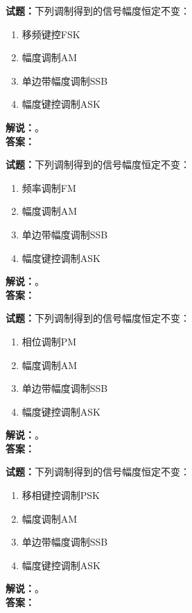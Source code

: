 \documentclass{ctexbook}
\begin{document}
\bigskip




\noindent\textbf{试题：}下列调制得到的信号幅度恒定不变：
\begin{enumerate}[leftmargin=3em]
\item 移频键控FSK
\item 幅度调制AM
\item 单边带幅度调制SSB
\item 幅度键控调制ASK
\end{enumerate}
\noindent\textbf{解说：}\textbf{}。\\\noindent\textbf{答案：}

\bigskip




\noindent\textbf{试题：}下列调制得到的信号幅度恒定不变：
\begin{enumerate}[leftmargin=3em]
\item 频率调制FM
\item 幅度调制AM
\item 单边带幅度调制SSB
\item 幅度键控调制ASK
\end{enumerate}
\noindent\textbf{解说：}\textbf{}。\\\noindent\textbf{答案：}

\bigskip




\noindent\textbf{试题：}下列调制得到的信号幅度恒定不变：
\begin{enumerate}[leftmargin=3em]
\item 相位调制PM
\item 幅度调制AM
\item 单边带幅度调制SSB
\item 幅度键控调制ASK
\end{enumerate}
\noindent\textbf{解说：}\textbf{}。\\\noindent\textbf{答案：}

\bigskip




\noindent\textbf{试题：}下列调制得到的信号幅度恒定不变：
\begin{enumerate}[leftmargin=3em]
\item 移相键控调制PSK
\item 幅度调制AM
\item 单边带幅度调制SSB
\item 幅度键控调制ASK
\end{enumerate}
\noindent\textbf{解说：}\textbf{}。\\\noindent\textbf{答案：}
\end{document}
